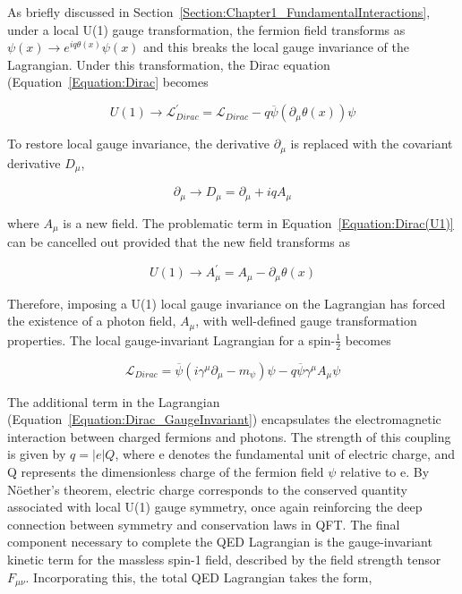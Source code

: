 As briefly discussed in Section~\ref{Section:Chapter1_FundamentalInteractions}, under a local U(1) gauge transformation, the fermion field transforms as $\psi(x) \rightarrow e^{iq\theta(x)} \psi(x)$ and this breaks the local gauge invariance of the Lagrangian. Under this transformation, the Dirac equation (Equation~\ref{Equation:Dirac} becomes

\begin{equation}
    U(1) \rightarrow \mathcal{L}_{Dirac}^{\prime} = \mathcal{L}_{Dirac} - q\overline{\psi}(\partial_\mu\theta(x))\psi
\label{Equation:Dirac(U1)}
\end{equation}

To restore local gauge invariance, the derivative $\partial_\mu$ is replaced with the covariant derivative $D_\mu$,

\begin{equation}
    \partial_\mu \rightarrow D_\mu = \partial_\mu + iqA_\mu
\end{equation}

where $A_\mu$ is a new field. The problematic term in Equation~\ref{Equation:Dirac(U1)} can be cancelled out provided that the new field transforms as

\begin{equation}
    U(1) \rightarrow A_\mu^{\prime} = A_\mu - \partial_\mu \theta(x) 
\end{equation}

Therefore, imposing a U(1) local gauge invariance on the Lagrangian has forced the existence of a photon field, $A_\mu$, with well-defined gauge transformation properties. The local gauge-invariant Lagrangian for a spin-$\frac{1}{2}$ becomes

\begin{equation}
    \mathcal{L}_{Dirac} = \overline{\psi}(i\gamma^\mu \partial_\mu - m_{\psi}) \psi - q\overline{\psi}\gamma^\mu A_\mu\psi
\label{Equation:Dirac_GaugeInvariant}
\end{equation}

The additional term in the Lagrangian (Equation~\ref{Equation:Dirac_GaugeInvariant}) encapsulates the electromagnetic interaction between charged fermions and photons. The strength of this coupling is given by $q = |e|Q$, where e denotes the fundamental unit of electric charge, and Q represents the dimensionless charge of the fermion field $\psi$ relative to e. By N\"{o}ether's theorem, electric charge corresponds to the conserved quantity associated with local U(1) gauge symmetry, once again reinforcing the deep connection between symmetry and conservation laws in QFT. The final component necessary to complete the QED Lagrangian is the gauge-invariant kinetic term for the massless spin-1 field, described by the field strength tensor $F_{\mu\nu}$. Incorporating this, the total QED Lagrangian takes the form,

